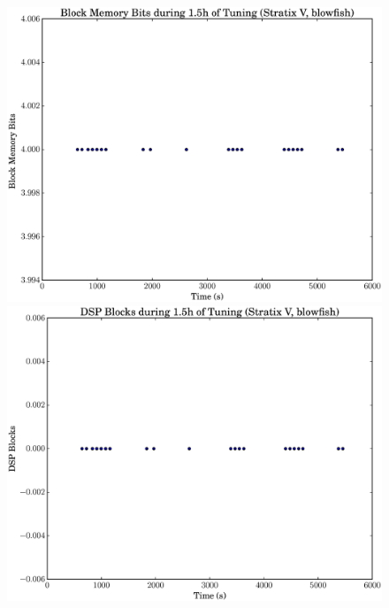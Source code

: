 \documentclass[12pt, a4paper]{article}
\begin{document}
\begin{figure}[htpb]
    \begin{minipage}{.48\textwidth}
        \includegraphics[scale=.25]{blowfish_block_5400_chstone_StratixV}
    \end{minipage}%
    \hfill
    \begin{minipage}{.48\textwidth}
        \includegraphics[scale=.25]{blowfish_dsp_5400_chstone_StratixV}
    \end{minipage}%


\end{figure}
\end{document}
